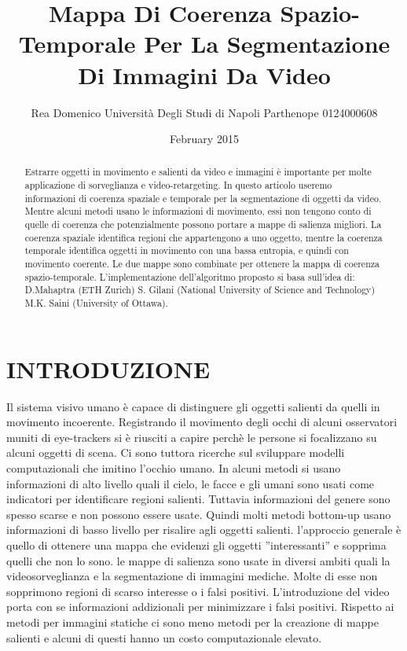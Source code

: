 \documentclass[12pt,twocolumn]{IEEEtran}
\begin{document}
	\title{Mappa Di Coerenza Spazio-Temporale Per La Segmentazione Di Immagini Da Video}
	\author{Rea Domenico Università Degli Studi di Napoli Parthenope 0124000608}
	\date{February 2015}
	\maketitle
	\begin{abstract}
	Estrarre oggetti in movimento e salienti da video e immagini è importante per molte applicazione di sorveglianza e video-retargeting. In questo articolo useremo informazioni di coerenza spaziale e temporale per la segmentazione di oggetti da video. Mentre alcuni metodi usano le informazioni di movimento, essi non tengono conto di quelle di coerenza che potenzialmente possono portare a mappe di salienza migliori. La coerenza spaziale identifica regioni che appartengono a uno oggetto, mentre la coerenza temporale identifica oggetti in movimento con una bassa entropia, e quindi con movimento coerente. Le due mappe sono combinate per ottenere la mappa di coerenza spazio-temporale.
	L'implementazione dell'algoritmo proposto si basa sull'idea di:\newline
	D.Mahaptra (ETH Zurich)\newline
	S. Gilani (National University of Science and Technology)\newline
	M.K. Saini (University of Ottawa).
	\end{abstract}
	\section{INTRODUZIONE}
		Il sistema visivo umano è capace di distinguere gli oggetti salienti da quelli in movimento incoerente. Registrando il movimento degli occhi di alcuni osservatori muniti di eye-trackers si è riusciti a capire perchè le persone si focalizzano su alcuni oggetti di scena. Ci sono tuttora ricerche sul sviluppare modelli computazionali che imitino l'occhio umano. In alcuni metodi si usano informazioni di alto livello quali il cielo, le facce e gli umani sono usati come indicatori per identificare regioni salienti. Tuttavia informazioni del genere sono spesso scarse e non possono essere usate. Quindi molti metodi bottom-up usano informazioni di basso livello per risalire agli oggetti salienti. l'approccio generale è quello di ottenere una mappa che evidenzi gli oggetti ''interessanti'' e sopprima quelli che non lo sono. le mappe di salienza sono usate in diversi ambiti quali la videosorveglianza e la segmentazione di immagini mediche. Molte di esse non sopprimono regioni di scarso interesse o i falsi positivi.\newline
		L'introduzione del video porta con se informazioni addizionali per minimizzare i falsi positivi.
		Rispetto ai metodi per immagini statiche ci sono meno metodi per la creazione di mappe salienti e alcuni di questi hanno un costo computazionale elevato.
\end{document}
